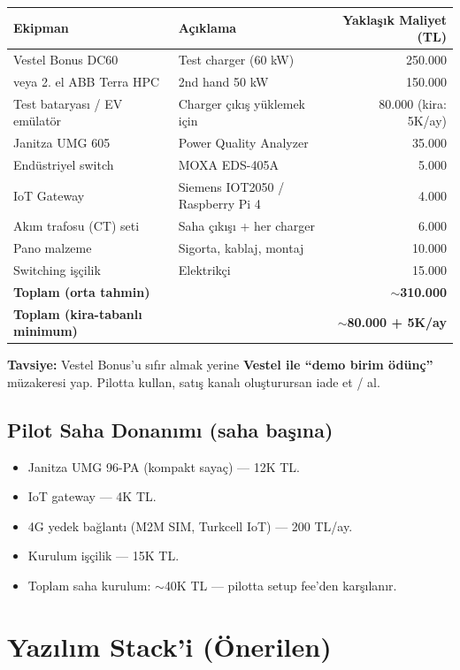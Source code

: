 \documentclass[11pt,a4paper]{article}
\begin{document}
\begin{tabularx}{\textwidth}{l X r}
\toprule
\textbf{Ekipman} & \textbf{Açıklama} & \textbf{Yaklaşık Maliyet (TL)} \\
\midrule
Vestel Bonus DC60 & Test charger (60 kW) & 250.000 \\
veya 2. el ABB Terra HPC & 2nd hand 50 kW & 150.000 \\
Test bataryası / EV emülatör & Charger çıkış yüklemek için & 80.000 (kira: 5K/ay) \\
Janitza UMG 605 & Power Quality Analyzer & 35.000 \\
Endüstriyel switch & MOXA EDS-405A & 5.000 \\
IoT Gateway & Siemens IOT2050 / Raspberry Pi 4 & 4.000 \\
Akım trafosu (CT) seti & Saha çıkışı + her charger & 6.000 \\
Pano malzeme & Sigorta, kablaj, montaj & 10.000 \\
Switching işçilik & Elektrikçi & 15.000 \\
\midrule
\textbf{Toplam (orta tahmin)} & & \textbf{$\sim$310.000} \\
\textbf{Toplam (kira-tabanlı minimum)} & & \textbf{$\sim$80.000 + 5K/ay} \\
\bottomrule
\end{tabularx}

\textbf{Tavsiye:} Vestel Bonus'u sıfır almak yerine \textbf{Vestel ile ``demo birim ödünç''} müzakeresi yap. Pilotta kullan, satış kanalı oluşturursan iade et / al.

\subsection{Pilot Saha Donanımı (saha başına)}

\begin{itemize}
    \item Janitza UMG 96-PA (kompakt sayaç) --- 12K TL.
    \item IoT gateway --- 4K TL.
    \item 4G yedek bağlantı (M2M SIM, Turkcell IoT) --- 200 TL/ay.
    \item Kurulum işçilik --- 15K TL.
    \item Toplam saha kurulum: $\sim$40K TL — pilotta setup fee'den karşılanır.
\end{itemize}

\section{Yazılım Stack'i (Önerilen)}
\end{document}

